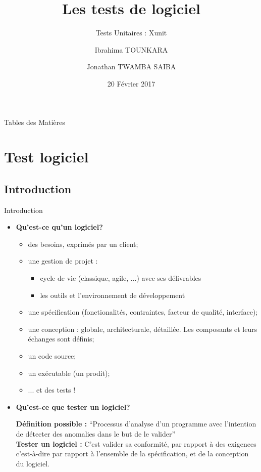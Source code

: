 \documentclass{beamer}
\title{Les tests de logiciel}
\subtitle{Tests Unitaires : Xunit}
\author{Ibrahima TOUNKARA \and Jonathan TWAMBA SAIBA}
\institute{Université de Montpellier} %
\date{20 Février 2017}
\begin{document}
\begin{frame}
  \titlepage
\end{frame}

\begin{frame}{Tables des Matières}
  \tableofcontents
\end{frame}

\section{Test logiciel}

\subsection{Introduction}

\begin{frame}[allowframebreaks]{Introduction}
  \begin{itemize}
    
  \item {\bfseries Qu’est-ce qu’un logiciel?}
    \begin{itemize}
    \item {des besoins, exprimés par un client;}
    \item{une gestion de projet :}
      \begin{itemize}
      \item {cycle de vie (classique, agile, ...) avec ses délivrables}
      \item{les outils et l’environnement de développement}
      \end{itemize}
    \item{une spéciﬁcation (fonctionalités, contraintes, facteur de qualité, interface);}
    \item{une conception : globale, architecturale, détaillée. Les composants et leurs échanges sont définis;}
    \item{un code source;}
    \item{un exécutable (un prodit);}
    \item{... {\color {blue} et des tests !}}
    \end{itemize} 
  
  \item {\bfseries Qu’est-ce que tester un logiciel? \\}
    \begin{itemize}
      {\bfseries Définition possible : }“Processus d’analyse d’un programme avec l’intention de détecter des anomalies dans le but de le valider” \\
      {\bfseries Tester un logiciel : }C’est valider sa conformité, par rapport à des exigences c’est-à-dire par rapport à l’ensemble de la spécification, et de la conception du logiciel.
    \end{itemize}

  \end{itemize}
\end{frame}
\end{document}
